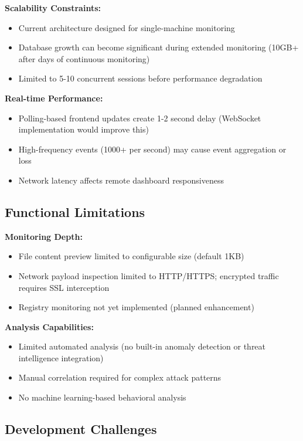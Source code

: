 \textbf{Scalability Constraints:}
\begin{itemize}
    \item Current architecture designed for single-machine monitoring
    \item Database growth can become significant during extended monitoring (10GB+ after days of continuous monitoring)
    \item Limited to 5-10 concurrent sessions before performance degradation
\end{itemize}

\textbf{Real-time Performance:}
\begin{itemize}
    \item Polling-based frontend updates create 1-2 second delay (WebSocket implementation would improve this)
    \item High-frequency events (1000+ per second) may cause event aggregation or loss
    \item Network latency affects remote dashboard responsiveness
\end{itemize}

\subsection{Functional Limitations}

\textbf{Monitoring Depth:}
\begin{itemize}
    \item File content preview limited to configurable size (default 1KB)
    \item Network payload inspection limited to HTTP/HTTPS; encrypted traffic requires SSL interception
    \item Registry monitoring not yet implemented (planned enhancement)
\end{itemize}

\textbf{Analysis Capabilities:}
\begin{itemize}
    \item Limited automated analysis (no built-in anomaly detection or threat intelligence integration)
    \item Manual correlation required for complex attack patterns
    \item No machine learning-based behavioral analysis
\end{itemize}

\subsection{Development Challenges}

